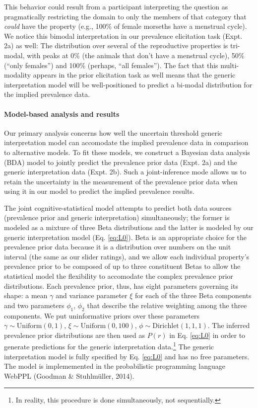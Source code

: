 \documentclass[floatsintext,doc]{apa6}
\theoremstyle{definition}
\theoremstyle{definition}
\theoremstyle{definition}
\theoremstyle{remark}
\begin{document}
  This behavior could
result from a participant interpreting the question as pragmatically
restricting the domain to only the members of that category that
\emph{could} have the property (e.g., 100\% of female morseths have a
menstrual cycle). We notice this bimodal interpretation in our
prevalence elicitation task (Expt. 2a) as well: The distribution over
several of the reproductive properties is tri-modal, with peaks at 0\%
(the animals that don't have a menstrual cycle), 50\% (\enquote{only
females}) and 100\% (perhaps, \enquote{all females}). The fact that this
multi-modality appears in the prior elicitation task as well means that
the generic interpretation model will be well-positioned to predict a
bi-modal distribution for the implied prevalence data.

\paragraph{Model-based analysis and
results}\label{model-based-analysis-and-results-1}

Our primary analysis concerns how well the uncertain threshold generic
interpretation model can accomodate the implied prevalence data in
comparison to alternative models. To fit these models, we construct a
Bayesian data analysis (BDA) model to jointly predict the prevalence
prior data (Expt. 2a) and the generic interpretation data (Expt. 2b).
Such a joint-inference mode allows us to retain the uncertainty in the
measurement of the prevalence prior data when using it in our model to
predict the implied prevalence results. 

The joint cognitive-statistical model attempts to predict both data
sources (prevalence prior and generic interpretation) simultaneously;
the former is modeled as a mixture of three Beta distributions and the
latter is modeled by our generic interpretation model (Eq. \ref{eq:L0}).
Beta is an appropriate choice for the prevalence prior data because it
is a distribution over numbers on the unit interval (the same as our
slider ratings), and we allow each individual property's prevalence
prior to be composed of up to three constituent Betas to allow the
statistical model the flexibility to accomodate the complex prevalence
prior distributions. Each prevalence prior, thus, has eight parameters
governing its shape: a mean \(\gamma\) and variance parameter \(\xi\)
for each of the three Beta components and two parameters \(\phi_1\),
\(\phi_2\) that describe the relative weighting among the three
components. We put uninformative priors over these parameters
\(\gamma \sim \text{Uniform}(0, 1)\),
\(\xi \sim \text{Uniform}(0, 100)\),
\(\phi \sim \text{Dirichlet}(1,1,1)\). The inferred prevalence prior
distributions are then used as \(P(r)\) in Eq. \ref{eq:L0} in order to
generate predictions for the generic interpretation data.\footnote{In
  reality, this procedure is done simultaneously, not sequentially.} The
generic interpretation model is fully specified by Eq. \ref{eq:L0} and
has no free parameters. The model is implememented in the probabilistic
programming language WebPPL (Goodman \& Stuhlmüller, 2014).
\end{document}
